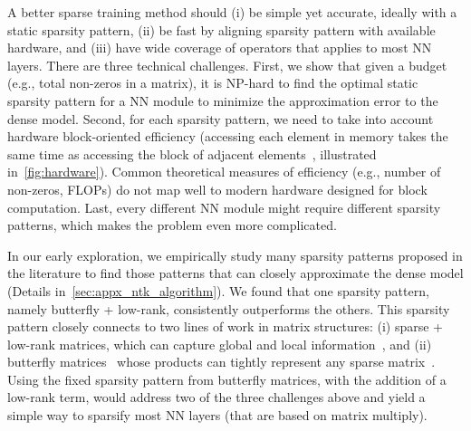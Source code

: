 A better sparse training method should (i) be simple yet accurate, ideally with a static sparsity pattern, (ii) be fast by aligning sparsity pattern with available hardware, and (iii) have wide coverage of operators that applies to most NN layers.
There are three technical challenges.
First, we show that given a budget (e.g., total non-zeros in a matrix), it is NP-hard to find the optimal static sparsity pattern for a NN module to minimize the approximation error to the dense model. 
Second, for each sparsity pattern, we need to take into account hardware block-oriented efficiency (accessing each element in memory takes the same time as accessing the block of adjacent elements~\citep{cook2012cuda}, illustrated in~\cref{fig:hardware}). Common theoretical measures of efficiency (e.g., number of non-zeros, FLOPs) do not map well to modern hardware designed for block computation.
Last, every different NN module might require different sparsity patterns, which makes the problem even more complicated.


In our early exploration, we empirically study many sparsity patterns proposed in the literature to find those patterns that can closely approximate the dense model (Details in~\cref{sec:appx_ntk_algorithm}). We found that one sparsity pattern, namely butterfly + low-rank, consistently outperforms the others. This sparsity pattern closely connects to two lines of work in matrix structures: (i) sparse + low-rank matrices, which can capture global and local information~\citep{candes2011robust,udell2019big, scatterbrain}, and (ii) butterfly matrices~\citep{parker1995random,dao2019learning} whose products can tightly represent any sparse matrix~\citep{desa2018two, dao2020kaleidoscope}.
Using the fixed sparsity pattern from butterfly matrices, with the addition of a low-rank term, would address two of the three challenges above and yield a simple way to sparsify most NN layers (that are based on matrix multiply). 


